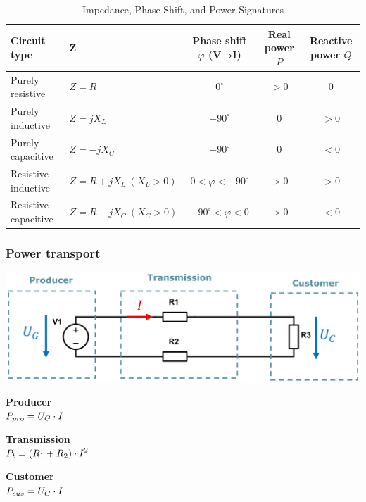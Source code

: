 \documentclass{article}
\begin{document}
\begin{table}[h]
  \centering
  \caption{Impedance, Phase Shift, and Power Signatures}
  \begin{tabular}{l | l | c | c | c}
    \hline
    \textbf{Circuit type}            & $\mathbf{Z}$            & \textbf{Phase shift $\varphi$ (V→I)} & \textbf{Real power $P$} & \textbf{Reactive power $Q$} \\
    \hline
    Purely resistive    & $Z = R$                  & $0^\circ$             & $>0$         & $0$            \\
    Purely inductive    & $Z = jX_L$               & $+90^\circ$           & $0$          & $>0$           \\
    Purely capacitive   & $Z = -jX_C$              & $-90^\circ$           & $0$          & $<0$           \\
    Resistive--inductive & $Z = R + jX_L\ (X_L>0)$  & $0 < \varphi < +90^\circ$  & $>0$ & $>0$           \\
    Resistive--capacitive& $Z = R - jX_C\ (X_C>0)$  & $-90^\circ < \varphi < 0$  & $>0$ & $<0$           \\
    \hline
  \end{tabular}
\end{table}

\newpage
\subsubsection{Power transport}
\begin{center}
    \includegraphics[width=.95\textwidth]{media/power_transport.png}
\end{center}

\begin{center}
    \begin{minipage}[t]{0.3\textwidth}
        \centering
        \textbf{Producer}\\[1ex]
        $\displaystyle P_{pro} = U_G\cdot I$
    \end{minipage}
    \hfill
    \begin{minipage}[t]{0.3\textwidth}
        \centering
        \textbf{Transmission}\\[1ex]
        $\displaystyle P_{t} = (R_1+R_2)\cdot I^2$
    \end{minipage}
    \hfill
    \begin{minipage}[t]{0.3\textwidth}
        \centering
        \textbf{Customer}\\[1ex]
        $\displaystyle P_{cus} = U_C\cdot I$
    \end{minipage}
\end{center}
\vspace*{.5cm}
\end{document}
